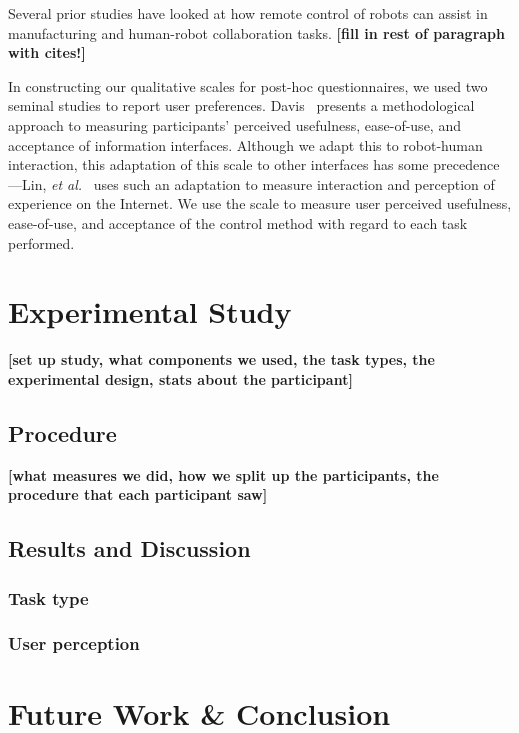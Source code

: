 \documentclass{sigchi}
\begin{document}
Several prior studies have looked at how remote control of robots can assist in manufacturing and human-robot collaboration tasks.  \textbf{[fill in rest of paragraph with cites!]}

In constructing our qualitative scales for post-hoc questionnaires, we used two seminal studies to report user preferences.  Davis~\cite{Davis1989} presents a methodological approach to measuring participants' perceived usefulness, ease-of-use, and acceptance of information interfaces. Although we adapt this to robot-human interaction, this adaptation of this scale to other interfaces has some precedence---Lin, \emph{et al.}~\cite{Lin2008} uses such an adaptation to measure interaction and perception of experience on the Internet.  We use the scale to measure user perceived usefulness, ease-of-use, and acceptance of the control method with regard to each task performed.


\section{Experimental Study}

\textbf{[set up study, what components we used, the task types, the experimental design, stats about the participant]}

\subsection{Procedure}

\textbf{[what measures we did, how we split up the participants, the procedure that each participant saw]}

\subsection{Results and Discussion}
\subsubsection{Task type}

\subsubsection{User perception}

\section{Future Work \& Conclusion}


\end{document}
